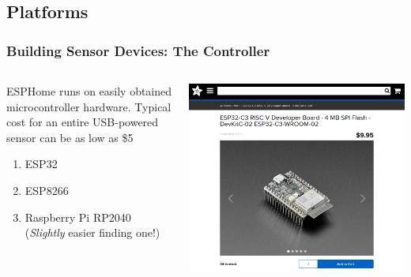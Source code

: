 \documentclass[aspectratio=169]{beamer}
\begin{document}
\subsection{Platforms}
\begin{frame}[fragile]
  \frametitle{Building Sensor Devices: The Controller}
  \begin{columns}[]
    \begin{column}[T]{0.45\paperwidth}
      ESPHome runs on easily obtained microcontroller hardware.
      \vfill
      Typical cost for an entire USB-powered sensor can be as low as \$5
      \begin{enumerate}%
        \item{ESP32}
        \item{ESP8266}
        \item{Raspberry Pi RP2040 \tiny{(\emph{Slightly} easier finding one!)}}
      \end{enumerate}
    \end{column}
    \begin{column}[T]{0.45\paperwidth}
      \includegraphics[width=0.45\paperwidth,keepaspectratio]{images/esp32-ada.png}
    \end{column}
  \end{columns}
\end{frame}

\end{document}
